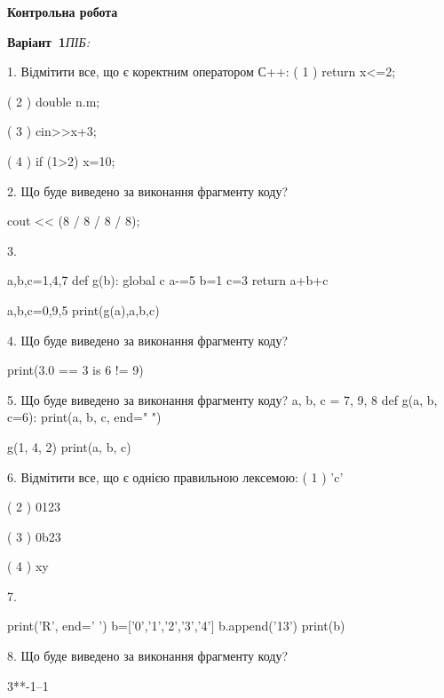 \documentclass[11pt]{article}
\begin{document}
{\large\textbf{Контрольна робота}}

\textbf{Варіант \No\,1}\hfill \textit{ПІБ:}\,\underline{\hspace{60mm}}
\vspace{4mm}

1. %
Відмітити все, що є коректним оператором С++:
( 1 ) return x<=2;

( 2 ) double n.m;

( 3 ) cin>>x+3;

( 4 ) if (1>2) x=10;
\vspace{5mm}

2. Що буде виведено за виконання фрагменту коду?

cout << (8 / 8 / 8 / 8);
\vspace{5mm}

3. 

a,b,c=1,4,7
def g(b):
global c    a-=5
    b=1
    c=3
    return a+b+c

a,b,c=0,9,5
print(g(a),a,b,c)
\vspace{5mm}

4. Що буде виведено за виконання фрагменту коду?

print(3.0 == 3 is 6 != 9)
\vspace{5mm}

5. Що буде виведено за виконання фрагменту коду?
a, b, c = 7, 9, 8
def g(a, b, c=6):
    print(a, b, c, end=" ")

g(1, 4, 2)
print(a, b, c)
\vspace{5mm}

6. %
Відмітити все, що є однією правильною лексемою:
( 1 ) 'c'

( 2 ) 0123

( 3 ) 0b23

( 4 ) xy
\vspace{5mm}

7. 

print('R', end=' ')
b=['0','1','2','3','4']
b.append('13')
print(b)

\vspace{5mm}

8. Що буде виведено за виконання фрагменту коду?

3**-1--1
\vspace{5mm}
\end{document}
